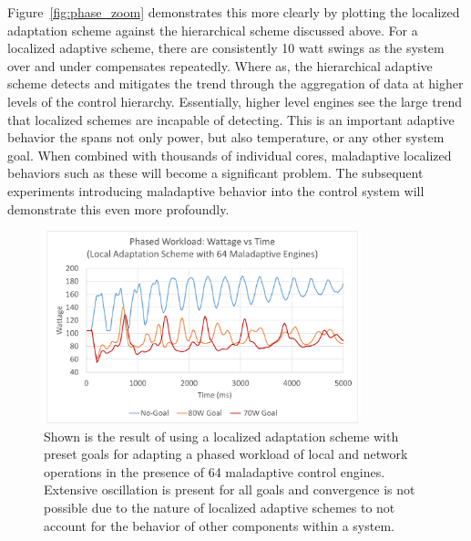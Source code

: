             Figure~\ref{fig:phase_zoom} demonstrates this more clearly by plotting the localized adaptation scheme against the hierarchical scheme discussed above. For a localized adaptive scheme, there are consistently 10 watt swings as the system over and under compensates repeatedly. Where as, the hierarchical adaptive scheme detects and mitigates the trend through the aggregation of data at higher levels of the control hierarchy. Essentially, higher level engines see the large trend that localized schemes are incapable of detecting. This is an important adaptive behavior the spans not only power, but also temperature, or any other system goal. When combined with thousands of individual cores, maladaptive localized behaviors such as these will become a significant problem. The subsequent experiments introducing maladaptive behavior into the control system will demonstrate this even more profoundly.

            \begin{figure}[htb!]
                \centering
                \includegraphics[width=0.82\textwidth]{Fig/phase_local_maladaptive.pdf}
                \caption[Phased Workload Using a Greedy Local Only Adaptive Policy with Maladaptive System Components (Watts vs Time)]{Shown is the result of using a localized adaptation scheme with preset goals for adapting a phased workload of local and network operations in the presence of 64 maladaptive control engines. Extensive oscillation is present for all goals and convergence is not possible due to the nature of localized adaptive schemes to not account for the behavior of other components within a system.}
                \label{fig:phase_local_maladaptive}
            \end{figure}

